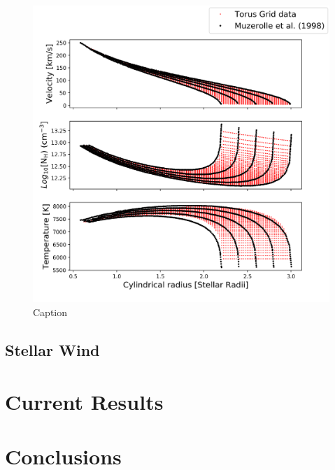\documentclass[fleqn,usenatbib]{mnras}
\begin{document}
\begin{figure}
    \centering
    \includegraphics[width=\linewidth,trim={0 1cm 0 0},clip]{figures/density}
    \caption{Caption}
    \label{fig:density}
\end{figure}


\subsection{Stellar Wind}

\section{Current Results}
\label{sec:results}

\section{Conclusions}
\label{sec:conclusions}




\end{document}
